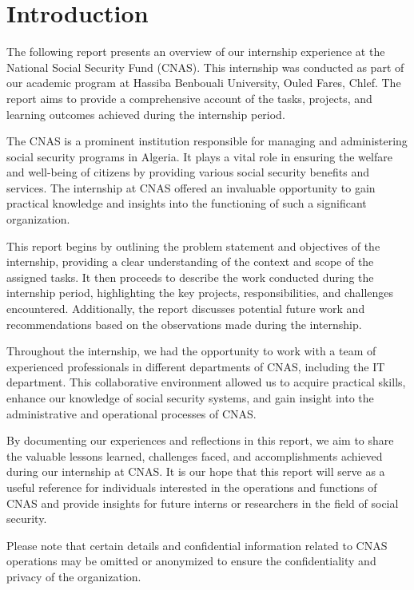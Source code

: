 \chapter*{Introduction}
The following report presents an overview of our internship experience at the National Social Security Fund (CNAS). This internship was conducted as part of our academic program at Hassiba Benbouali University, Ouled Fares, Chlef. The report aims to provide a comprehensive account of the tasks, projects, and learning outcomes achieved during the internship period.

The CNAS is a prominent institution responsible for managing and administering social security programs in Algeria. It plays a vital role in ensuring the welfare and well-being of citizens by providing various social security benefits and services. The internship at CNAS offered an invaluable opportunity to gain practical knowledge and insights into the functioning of such a significant organization.

This report begins by outlining the problem statement and objectives of the internship, providing a clear understanding of the context and scope of the assigned tasks. It then proceeds to describe the work conducted during the internship period, highlighting the key projects, responsibilities, and challenges encountered. Additionally, the report discusses potential future work and recommendations based on the observations made during the internship.

Throughout the internship, we had the opportunity to work with a team of experienced professionals in different departments of CNAS, including the IT department. This collaborative environment allowed us to acquire practical skills, enhance our knowledge of social security systems, and gain insight into the administrative and operational processes of CNAS.

By documenting our experiences and reflections in this report, we aim to share the valuable lessons learned, challenges faced, and accomplishments achieved during our internship at CNAS. It is our hope that this report will serve as a useful reference for individuals interested in the operations and functions of CNAS and provide insights for future interns or researchers in the field of social security.

Please note that certain details and confidential information related to CNAS operations may be omitted or anonymized to ensure the confidentiality and privacy of the organization.

